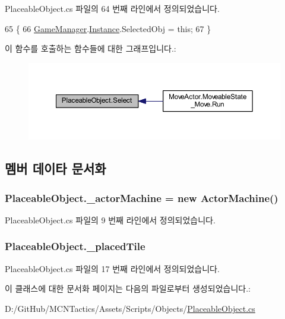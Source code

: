 Placeable\+Object.\+cs 파일의 64 번째 라인에서 정의되었습니다.


\begin{DoxyCode}
65     \{
66         \hyperlink{class_game_manager}{GameManager}.\hyperlink{class_m_c_n_1_1_singletone_a46dbbebd93e96a9592a9803c51f35602}{Instance}.SelectedObj = \textcolor{keyword}{this};
67     \}
\end{DoxyCode}


이 함수를 호출하는 함수들에 대한 그래프입니다.\+:\nopagebreak
\begin{figure}[H]
\begin{center}
\leavevmode
\includegraphics[width=350pt]{class_placeable_object_a019818f3f6c6eb715fed163efa921f5a_icgraph}
\end{center}
\end{figure}




\subsection{멤버 데이타 문서화}
\subsubsection[{\texorpdfstring{\+\_\+actor\+Machine}{_actorMachine}}]{ Placeable\+Object.\+\_\+actor\+Machine = new {\bf Actor\+Machine}()\hspace{0.3cm}{\ttfamily [private]}}\hypertarget{class_placeable_object_a1a9f2ccdb8b2e650d6bdda5abbad3ef9}{}\label{class_placeable_object_a1a9f2ccdb8b2e650d6bdda5abbad3ef9}


Placeable\+Object.\+cs 파일의 9 번째 라인에서 정의되었습니다.

\subsubsection[{\texorpdfstring{\+\_\+placed\+Tile}{_placedTile}}]{ Placeable\+Object.\+\_\+placed\+Tile\hspace{0.3cm}{\ttfamily [protected]}}\hypertarget{class_placeable_object_a0fd0566f0bb15c71b0630322762342d8}{}\label{class_placeable_object_a0fd0566f0bb15c71b0630322762342d8}


Placeable\+Object.\+cs 파일의 17 번째 라인에서 정의되었습니다.



이 클래스에 대한 문서화 페이지는 다음의 파일로부터 생성되었습니다.\+:\begin{DoxyCompactItemize}
\item 
D\+:/\+Git\+Hub/\+M\+C\+N\+Tactics/\+Assets/\+Scripts/\+Objects/\hyperlink{_placeable_object_8cs}{Placeable\+Object.\+cs}\end{DoxyCompactItemize}
